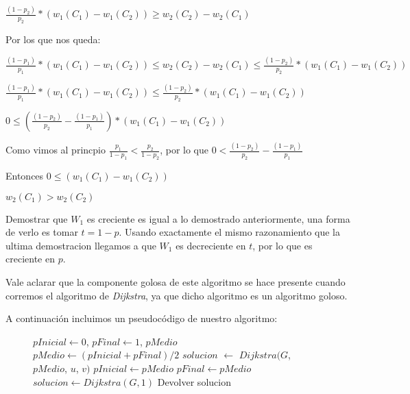 $\frac{(1-p_2)}{p_2}*(w_1(C_1) - w_1(C_2)) \geq  w_2(C_2) - w_2(C_1) $

Por los que nos queda:

$\frac{(1-p_1)}{p_1}*(w_1(C_1) - w_1(C_2)) \leq  w_2(C_2) - w_2(C_1) \leq \frac{(1-p_2)}{p_2}*(w_1(C_1) - w_1(C_2))$

$\frac{(1-p_1)}{p_1}*(w_1(C_1) - w_1(C_2)) \leq \frac{(1-p_2)}{p_2}*(w_1(C_1) - w_1(C_2))$

$ 0 \leq (\frac{(1-p_2)}{p_2} - \frac{(1-p_1)}{p_1})*(w_1(C_1) - w_1(C_2))$

Como vimos al princpio $\frac{p_1}{1-p_1} < \frac{p_2}{1-p_2}$, por lo que $0 < \frac{(1-p_2)}{p_2} - \frac{(1-p_1)}{p_1} $

Entonces $ 0 \leq (w_1(C_1) - w_1(C_2))$

$w_2(C_1) > w_2(C_2)$

Demostrar que $W_1$ es creciente es igual a lo demostrado anteriormente, una forma de verlo es tomar $t= 1-p$. Usando exactamente el mismo razonamiento que la ultima demostracion llegamos a que $W_1$ es decreciente en $t$, por lo que es creciente en $p$.


Vale aclarar que la componente golosa de este algoritmo se hace presente cuando corremos el algoritmo de \emph{Dijkstra}, ya que dicho algoritmo es un algoritmo goloso.

A continuación incluimos un pseudocódigo de nuestro algoritmo:

\begin{center}
 \begin{figure}[H]
  \begin{pseudo}
    \State $pInicial \leftarrow 0$, $pFinal \leftarrow 1$, $pMedio$
      \State $pMedio \leftarrow (pInicial + pFinal)/2$
      \State $solucion$ $\leftarrow$ $Dijkstra(G$, $pMedio$, $u$, $v)$
	 \State $pInicial \leftarrow pMedio$
      \Else
	 \State $pFinal \leftarrow pMedio$
      \EndIf
    \EndFor
      \State $solucion \leftarrow Dijkstra(G, 1)$
    \EndIf
    \State Devolver solucion
   \EndProcedure
  \end{pseudo}
 \end{figure}
\end{center}


